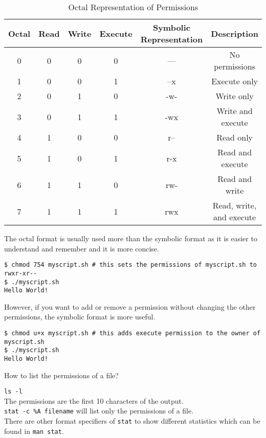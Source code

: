 \begin{table*}
\caption{Octal Representation of Permissions}
\begin{tabular}{ c c c c c c }
  \toprule
  Octal & Read & Write & Execute & Symbolic Representation & Description \\
 \midrule
  0 & 0 & 0 & 0 & --- & No permissions \\
  1 & 0 & 0 & 1 & --x & Execute only \\
  2 & 0 & 1 & 0 & -w- & Write only \\
  3 & 0 & 1 & 1 & -wx & Write and execute \\
  4 & 1 & 0 & 0 & r-- & Read only \\
  5 & 1 & 0 & 1 & r-x & Read and execute \\
  6 & 1 & 1 & 0 & rw- & Read and write \\
  7 & 1 & 1 & 1 & rwx & Read, write, and execute \\
 \bottomrule
\end{tabular}
\end{table*}

The octal format is usually used more than the symbolic format as it is easier to understand and remember and it is more concise.

\begin{lstlisting}
$ chmod 754 myscript.sh # this sets the permissions of myscript.sh to rwxr-xr--
$ ./myscript.sh
Hello World!
\end{lstlisting}

However, if you want to add or remove a permission without changing the other permissions, the symbolic format is more useful.

\begin{lstlisting}
$ chmod u+x myscript.sh # this adds execute permission to the owner of myscript.sh
$ ./myscript.sh
Hello World!
\end{lstlisting}

\begin{qs}
  How to list the permissions of a file?
\end{qs}

\begin{ans}
  \texttt{ls -l} \\
  The permissions are the first 10 characters of the output.\\
  \texttt{stat -c \%A filename} will list only the permissions of a file.\\
  There are other format specifiers of \texttt{stat} to show different statistics
  which can be found in \texttt{man stat}.
\end{ans}

